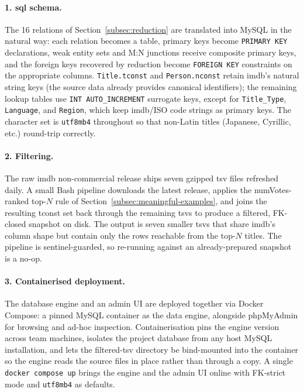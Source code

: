 \paragraph{1. \ac{sql} schema.}
The 16 relations of Section~\ref{subsec:reduction} are translated into MySQL in the natural way: each relation becomes a table, primary keys become \texttt{PRIMARY KEY} declarations, weak entity sets and M:N junctions receive composite primary keys, and the foreign keys recovered by reduction become \texttt{FOREIGN KEY} constraints on the appropriate columns. \texttt{Title.tconst} and \texttt{Person.nconst} retain \ac{imdb}'s natural string keys (the source data already provides canonical identifiers); the remaining lookup tables use \texttt{INT AUTO\_INCREMENT} surrogate keys, except for \texttt{Title\_Type}, \texttt{Language}, and \texttt{Region}, which keep \ac{imdb}/ISO code strings as primary keys. The character set is \texttt{utf8mb4} throughout so that non-Latin titles (Japanese, Cyrillic, etc.) round-trip correctly.

\paragraph{2. Filtering.}
The raw \ac{imdb} non-commercial release ships seven gzipped \ac{tsv} files refreshed daily. A small Bash pipeline downloads the latest release, applies the numVotes-ranked top-$N$ rule of Section~\ref{subsec:meaningful-examples}, and joins the resulting tconst set back through the remaining \acp{tsv} to produce a filtered, FK-closed snapshot on disk. The output is seven smaller \acp{tsv} that share \ac{imdb}'s column shape but contain only the rows reachable from the top-$N$ titles. The pipeline is sentinel-guarded, so re-running against an already-prepared snapshot is a no-op.

\paragraph{3. Containerised deployment.}
The database engine and an admin UI are deployed together via Docker Compose: a pinned MySQL container as the data engine, alongside phpMyAdmin for browsing and ad-hoc inspection. Containerisation pins the engine version across team machines, isolates the project database from any host MySQL installation, and lets the filtered-\ac{tsv} directory be bind-mounted into the container so the engine reads the source files in place rather than through a copy. A single \texttt{docker compose up} brings the engine and the admin UI online with FK-strict mode and \texttt{utf8mb4} as defaults.


